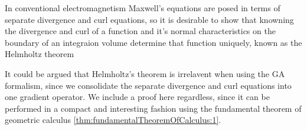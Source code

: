%
%
In conventional electromagnetism Maxwell's equations are posed in terms of separate divergence and curl equations, so it is desirable to show that knowning the divergence and curl of a function and it's normal characteristics on the boundary of an integraion volume determine that function uniquely, known as the Helmholtz theorem

It could be argued that Helmholtz's theorem is irrelavent when using the GA formalism, since we consolidate the separate divergence and curl equations into one gradient operator.
We include a proof here regardless, since it can be performed in a compact and interesting fashion using
the fundamental theorem of geometric calculus \cref{thm:fundamentalTheoremOfCalculus:1}.

